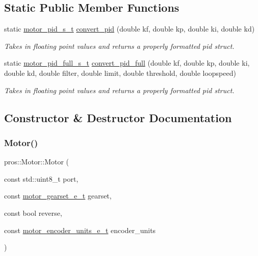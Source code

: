 \subsection*{Static Public Member Functions}
\begin{DoxyCompactItemize}
\item 
static \mbox{\hyperlink{motors_8h_ad2e907c8d7ce53c1fd91f1b9801072e3}{motor\+\_\+pid\+\_\+s\+\_\+t}} \mbox{\hyperlink{classpros_1_1Motor_adca7af38b0357c254e81ed882a2283a0}{convert\+\_\+pid}} (double kf, double kp, double ki, double kd)
\begin{DoxyCompactList}\small\item\em Takes in floating point values and returns a properly formatted pid struct. \end{DoxyCompactList}\item 
static \mbox{\hyperlink{motors_8h_a0295cbf49f5c70c17b5fa962bd25febd}{motor\+\_\+pid\+\_\+full\+\_\+s\+\_\+t}} \mbox{\hyperlink{classpros_1_1Motor_a2d8c9c462e47e989ebe64fa341be91c6}{convert\+\_\+pid\+\_\+full}} (double kf, double kp, double ki, double kd, double filter, double limit, double threshold, double loopspeed)
\begin{DoxyCompactList}\small\item\em Takes in floating point values and returns a properly formatted pid struct. \end{DoxyCompactList}\end{DoxyCompactItemize}


\subsection{Constructor \& Destructor Documentation}
\mbox{\label{classpros_1_1Motor_a5be9a41f9877208c887d5e2c081bc72e}} 
\subsubsection{\texorpdfstring{Motor()}{Motor()}\hspace{0.1cm}{\footnotesize\ttfamily [1/5]}}
{\footnotesize\ttfamily pros\+::\+Motor\+::\+Motor (\begin{DoxyParamCaption}\item[{const std\+::uint8\+\_\+t}]{port,  }\item[{const \mbox{\hyperlink{motors_8h_aa2f1c305c998abc3bf8dd1f76fa4da8b}{motor\+\_\+gearset\+\_\+e\+\_\+t}}}]{gearset,  }\item[{const bool}]{reverse,  }\item[{const \mbox{\hyperlink{motors_8h_a6677ba23760c558fd8b7b4e1e00a6123}{motor\+\_\+encoder\+\_\+units\+\_\+e\+\_\+t}}}]{encoder\+\_\+units }\end{DoxyParamCaption})\hspace{0.3cm}{\ttfamily [explicit]}}



